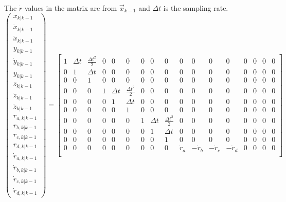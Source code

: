 The $\dot{r}$-values in the matrix are from $\vec{x}_{k-1}$ and $\Delta t$ is the sampling rate.
\begin{equation*}
    \begin{pmatrix}
        x_{k|k-1}\\
        \dot{x}_{k|k-1}\\
        \ddot{x}_{k|k-1}\\
        y_{k|k-1}\\
        \dot{y}_{k|k-1}\\
        \ddot{y}_{k|k-1}\\
        z_{k|k-1}\\
        \dot{z}_{k|k-1}\\
        \ddot{z}_{k|k-1}\\
        r_{a,k|k-1}\\
        r_{b,k|k-1}\\
        r_{c,k|k-1}\\
        r_{d,k|k-1}\\
        \dot{r}_{a,k|k-1}\\
        \dot{r}_{b,k|k-1}\\
        \dot{r}_{c,k|k-1}\\
        \dot{r}_{d,k|k-1}
    \end{pmatrix} = 
    \begin{bmatrix}
        1 & \Delta t & \frac{\Delta t^{2}}{2} & 0 & 0 & 0 & 0 & 0 & 0 & 0 & 0 & 0 & 0 & 0 & 0 & 0 & 0 \\
        0 & 1 & \Delta t & 0 & 0 & 0 & 0 & 0 & 0 & 0 & 0 & 0 & 0 & 0 & 0 & 0 & 0 \\
        0 & 0 & 1 & 0 & 0 & 0 & 0 & 0 & 0 & 0 & 0 & 0 & 0 & 0 & 0 & 0 & 0 \\
        0 & 0 & 0 & 1 & \Delta t & \frac{\Delta t^{2}}{2} & 0 & 0 & 0 & 0 & 0 & 0 & 0 & 0 & 0 & 0 & 0 \\
        0 & 0 & 0 & 0 & 1 & \Delta t & 0 & 0 & 0 & 0 & 0 & 0 & 0 & 0 & 0 & 0 & 0 \\
        0 & 0 & 0 & 0 & 0 & 1 & 0 & 0 & 0 & 0 & 0 & 0 & 0 & 0 & 0 & 0 & 0 \\
        0 & 0 & 0 & 0 & 0 & 0 & 1 & \Delta t & \frac{\Delta t^{2}}{2} & 0 & 0 & 0 & 0 & 0 & 0 & 0 & 0 \\
        0 & 0 & 0 & 0 & 0 & 0 & 0 & 1 & \Delta t & 0 & 0 & 0 & 0 & 0 & 0 & 0 & 0 \\
        0 & 0 & 0 & 0 & 0 & 0 & 0 & 0 & 1 & 0 & 0 & 0 & 0 & 0 & 0 & 0 & 0 \\
        0 & 0 & 0 & 0 & 0 & 0 & 0 & 0 & 0 & \dot{r}_{a} & -\dot{r}_{b} & -\dot{r}_{c} & -\dot{r}_{d} & 0 & 0 & 0 & 0 \\

\end{bmatrix}
\end{equation*}
